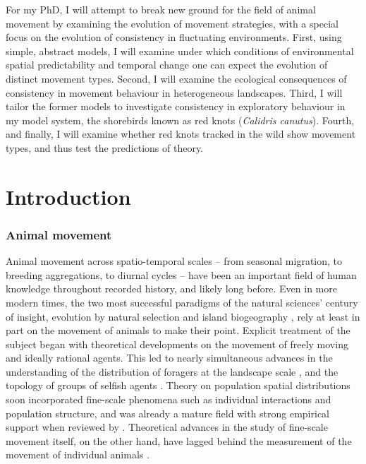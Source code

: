 For my PhD, I will attempt to break new ground for the field of animal movement by examining the evolution of movement strategies, with a special focus on the evolution of consistency in fluctuating environments. First, using simple, abstract models, I will examine under which conditions of environmental spatial predictability and temporal change one can expect the evolution of distinct movement types. Second, I will examine the ecological consequences of consistency in movement behaviour in heterogeneous landscapes. Third, I will tailor the former models to investigate consistency in exploratory behaviour in my model system, the shorebirds known as red knots (\emph{Calidris canutus}). Fourth, and finally, I will examine whether red knots tracked in the wild show movement types, and thus test the predictions of theory.

\newpage

\part{Introduction}

\section{Animal movement}

Animal movement across spatio-temporal scales -- from seasonal migration, to breeding aggregations, to diurnal cycles -- have been an important field of human knowledge throughout recorded history, and likely long before.
Even in more modern times, the two most successful paradigms of the natural sciences' century of insight, evolution by natural selection \citep{darwin1858} and island biogeography \citep{macarthur2001}, rely at least in part on the movement of animals to make their point.
Explicit treatment of the subject began with theoretical developments on the movement of freely moving and ideally rational agents. This led to nearly simultaneous advances in the understanding of the distribution of foragers at the landscape scale \citep{fretwell1970}, and the topology of groups of selfish agents \citep{hamilton1971}.
Theory on population spatial distributions soon incorporated fine-scale phenomena such as individual interactions and population structure, and was already a mature field with strong empirical support when reviewed by \citet{sutherland1996}.
Theoretical advances in the study of fine-scale movement itself, on the other hand, have lagged behind the measurement of the movement of individual animals \citep{holyoak2008}.

